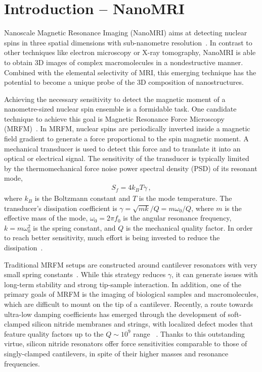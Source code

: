 \section{\label{sec:level1}Introduction -- NanoMRI} \label{sec:spins_intro} 
Nanoscale Magnetic Resonance Imaging (NanoMRI) aims at detecting nuclear spins in three spatial dimensions with sub-nanometre resolution~\cite{Sidles_1991, Degen_2009, Poggio_2010, Mamin_2013, Staudacher_2013, Loretz_2014}. In contrast to other techniques like electron microscopy or X-ray tomography, NanoMRI is able to obtain 3D images of complex macromolecules in a nondestructive manner. Combined with the elemental selectivity of MRI, this emerging technique has the potential to become a unique probe of the 3D composition of nanostructures.

Achieving the necessary sensitivity to detect the magnetic moment of a nanometre-sized nuclear spin ensemble is a formidable task. One candidate technique to achieve this goal is Magnetic Resonance Force Microscopy (MRFM)~\cite{Sidles_1991, Rugar_2004, Degen_2009, Nichol_2012, Nichol_2013, Moores_2015, Rose_2018}. In MRFM, nuclear spins are periodically inverted inside a magnetic field gradient to generate a force proportional to the spin magnetic moment. A mechanical transducer is used to detect this force and to translate it into an optical or electrical signal. The sensitivity of the transducer is typically limited by the thermomechanical force noise power spectral density (PSD) of its resonant mode,
\begin{align} \label{eq:1}
S_f = 4 k_B T \gamma \,,
\end{align}
where $k_B$ is the Boltzmann constant and $T$ is the mode temperature. The transducer's dissipation coefficient is $\gamma = \sqrt{m k}/Q = m \omega_0/Q$, where $m$ is the effective mass of the mode, $\omega_0=2\pi f_0$ is the angular resonance frequency, $k = m\omega_0^2$ is the spring constant, and $Q$ is the mechanical quality factor. In order to reach better sensitivity, much effort is being invested to reduce the dissipation~\cite{Mamin_2001, Moser_2013, Tao_2014, Weber_2016, Reinhardt_2016, Norte_2016, Rossi_2017, Delepinay_2017, Tsaturyan_2017, Heritier_2018, deBonis_2018, Ghadimi_2018}.

Traditional MRFM setups are constructed around cantilever resonators with very small spring constants~\cite{Mamin_2001, Moores_2015, Heritier_2018, Nichol_2012, Nichol_2013, Rose_2018, Rossi_2017}. While this strategy reduces $\gamma$, it can generate issues with long-term stability and strong tip-sample interaction. In addition, one of the primary goals of MRFM is the imaging of biological samples and macromolecules, which are difficult to mount on the tip of a cantilever. Recently, a route towards ultra-low damping coefficients has emerged through the development of soft-clamped silicon nitride membranes and strings, with localized defect modes that feature quality factors up to the $Q \sim 10^9$ range ~\cite{Tsaturyan_2017, Ghadimi_2018, Rossi_2018}. Thanks to this outstanding virtue, silicon nitride resonators offer force sensitivities comparable to those of singly-clamped cantilevers, in spite of their higher masses and resonance frequencies.

